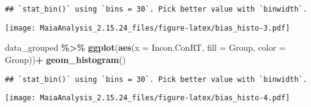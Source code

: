 \documentclass[
]{article}
\newenvironment{Shaded}{\begin{snugshade}}{\end{snugshade}}
\newcommand{\AttributeTok}[1]{\textcolor[rgb]{0.13,0.29,0.53}{#1}}
\newcommand{\CommentTok}[1]{\textcolor[rgb]{0.56,0.35,0.01}{\textit{#1}}}
\newcommand{\FloatTok}[1]{\textcolor[rgb]{0.00,0.00,0.81}{#1}}
\newcommand{\FunctionTok}[1]{\textcolor[rgb]{0.13,0.29,0.53}{\textbf{#1}}}
\newcommand{\NormalTok}[1]{#1}
\newcommand{\OtherTok}[1]{\textcolor[rgb]{0.56,0.35,0.01}{#1}}
\newcommand{\SpecialCharTok}[1]{\textcolor[rgb]{0.81,0.36,0.00}{\textbf{#1}}}
\newcommand{\StringTok}[1]{\textcolor[rgb]{0.31,0.60,0.02}{#1}}
\begin{document}
\begin{Shaded}
\end{Shaded}

\begin{verbatim}
## `stat_bin()` using `bins = 30`. Pick better value with `binwidth`.
\end{verbatim}

\texttt{[image: MaiaAnalysis\_2.15.24\_files/figure-latex/bias\_histo-3.pdf]}

\begin{Shaded}
\begin{Highlighting}[]
\NormalTok{data\_grouped }\SpecialCharTok{\%\textgreater{}\%}
  \FunctionTok{ggplot}\NormalTok{(}\FunctionTok{aes}\NormalTok{(}\AttributeTok{x =}\NormalTok{ Incon.ConRT, }\AttributeTok{fill =}\NormalTok{ Group, }\AttributeTok{color =}\NormalTok{ Group))}\SpecialCharTok{+}
  \FunctionTok{geom\_histogram}\NormalTok{()}
\end{Highlighting}
\end{Shaded}

\begin{verbatim}
## `stat_bin()` using `bins = 30`. Pick better value with `binwidth`.
\end{verbatim}

\texttt{[image: MaiaAnalysis\_2.15.24\_files/figure-latex/bias\_histo-4.pdf]}
\end{document}
